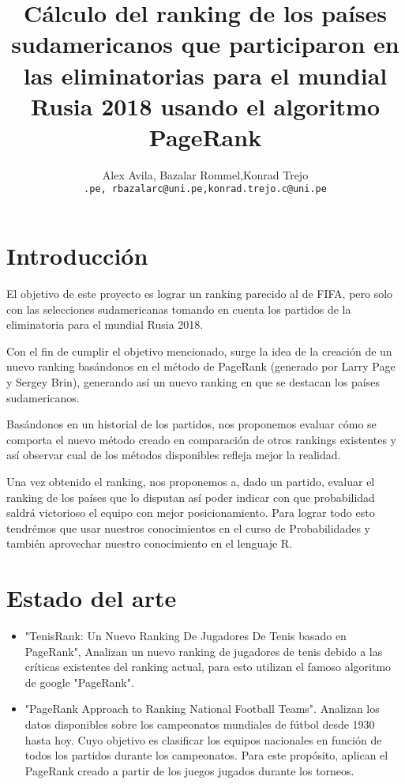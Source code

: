 \documentclass[twocolumn]{article}
\begin{document}
 

\title{
Cálculo del ranking de los países sudamericanos que participaron en las eliminatorias para el mundial Rusia 2018 usando el algoritmo PageRank
}
\date{}
\author{Alex Avila, Bazalar Rommel,Konrad Trejo\\
\small{\texttt{\@aavilas@uni.pe, rbazalarc@uni.pe,konrad.trejo.c@uni.pe}}}
\maketitle

\section{Introducción}

	El objetivo de este proyecto es lograr un ranking parecido al de FIFA, pero solo con las selecciones sudamericanas tomando en cuenta los partidos de la eliminatoria para el mundial Rusia 2018.

	Con el fin de cumplir el objetivo mencionado, surge la idea de la creación de un nuevo ranking basándonos en el método de PageRank (generado por Larry Page y Sergey Brin), generando así un nuevo ranking en que se destacan los países sudamericanos.

	Basándonos en un historial de los partidos, nos proponemos evaluar cómo se comporta el nuevo método creado en comparación de otros rankings existentes y así observar cual de los métodos disponibles refleja mejor la realidad.

	Una vez obtenido el ranking, nos proponemos a, dado un partido, evaluar el ranking de los países que lo disputan  así poder indicar con que probabilidad saldrá victorioso el equipo con mejor posicionamiento. Para lograr todo esto tendrémos que usar nuestros conocimientos en el curso de Probabilidades y también aprovechar nuestro conocimiento en el lenguaje R.


\section{Estado del arte}
\begin{itemize}
	\item
	"TenisRank: Un Nuevo Ranking De Jugadores De Tenis
basado en PageRank", Analizan un nuevo ranking de jugadores de tenis debido a las críticas existentes del ranking actual, para esto utilizan el famoso algoritmo de google "PageRank".
	\item
	"PageRank Approach to Ranking National Football Teams". Analizan los datos disponibles sobre los campeonatos mundiales de fútbol desde 1930 hasta hoy. Cuyo objetivo es clasificar los equipos nacionales en función de todos los partidos durante los campeonatos. Para este propósito, aplican el PageRank creado a partir de los juegos jugados durante los torneos. 
	\end{itemize}	
\end{document}
